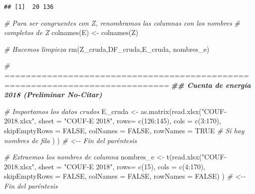 \documentclass[
]{article}
\newenvironment{Shaded}{\begin{snugshade}}{\end{snugshade}}
\newcommand{\AttributeTok}[1]{\textcolor[rgb]{0.77,0.63,0.00}{#1}}
\newcommand{\CommentTok}[1]{\textcolor[rgb]{0.56,0.35,0.01}{\textit{#1}}}
\newcommand{\ConstantTok}[1]{\textcolor[rgb]{0.00,0.00,0.00}{#1}}
\newcommand{\DecValTok}[1]{\textcolor[rgb]{0.00,0.00,0.81}{#1}}
\newcommand{\DocumentationTok}[1]{\textcolor[rgb]{0.56,0.35,0.01}{\textbf{\textit{#1}}}}
\newcommand{\FunctionTok}[1]{\textcolor[rgb]{0.00,0.00,0.00}{#1}}
\newcommand{\NormalTok}[1]{#1}
\newcommand{\OtherTok}[1]{\textcolor[rgb]{0.56,0.35,0.01}{#1}}
\newcommand{\SpecialCharTok}[1]{\textcolor[rgb]{0.00,0.00,0.00}{#1}}
\newcommand{\StringTok}[1]{\textcolor[rgb]{0.31,0.60,0.02}{#1}}
\begin{document}
\begin{verbatim}
## [1]  20 136
\end{verbatim}

\begin{Shaded}
\begin{Highlighting}[]
\CommentTok{\# Para ser congruentes con Z, renombramos las columnas con los nombres}
\CommentTok{\# completos de Z}
\FunctionTok{colnames}\NormalTok{(E) }\OtherTok{\textless{}{-}} \FunctionTok{colnames}\NormalTok{(Z)}

\CommentTok{\# Hacemos limpieza}
\FunctionTok{rm}\NormalTok{(Z\_cruda,DF\_cruda,E\_cruda, nombres\_e)}

\CommentTok{\# =============================================================================}
\DocumentationTok{\#\# Cuenta de energía 2018 (Preliminar No{-}Citar)}

\CommentTok{\# Importamos los datos crudos}
\NormalTok{E\_cruda }\OtherTok{\textless{}{-}} \FunctionTok{as.matrix}\NormalTok{(}\FunctionTok{read.xlsx}\NormalTok{(}\StringTok{"COUF{-}2018.xlsx"}\NormalTok{, }
                               \AttributeTok{sheet =} \StringTok{"COUF{-}E 2018"}\NormalTok{, }
                               \AttributeTok{rows=} \FunctionTok{c}\NormalTok{(}\DecValTok{126}\SpecialCharTok{:}\DecValTok{145}\NormalTok{), }
                               \AttributeTok{cols =} \FunctionTok{c}\NormalTok{(}\DecValTok{3}\SpecialCharTok{:}\DecValTok{170}\NormalTok{), }
                               \AttributeTok{skipEmptyRows =} \ConstantTok{FALSE}\NormalTok{, }
                               \AttributeTok{colNames =} \ConstantTok{FALSE}\NormalTok{, }
                               \AttributeTok{rowNames =} \ConstantTok{TRUE} \CommentTok{\# Sí hay nombres de fila}
\NormalTok{                               )}
\NormalTok{)  }\CommentTok{\# \textless{}{-}{-} Fin del paréntesis}

\CommentTok{\# Extraemos los nombres de columna}
\NormalTok{nombres\_e }\OtherTok{\textless{}{-}} \FunctionTok{t}\NormalTok{(}\FunctionTok{read.xlsx}\NormalTok{(}\StringTok{"COUF{-}2018.xlsx"}\NormalTok{, }
                         \AttributeTok{sheet =} \StringTok{"COUF{-}E 2018"}\NormalTok{, }
                         \AttributeTok{rows=} \FunctionTok{c}\NormalTok{(}\DecValTok{15}\NormalTok{), }
                         \AttributeTok{cols =} \FunctionTok{c}\NormalTok{(}\DecValTok{4}\SpecialCharTok{:}\DecValTok{170}\NormalTok{), }
                         \AttributeTok{skipEmptyRows =} \ConstantTok{FALSE}\NormalTok{, }
                         \AttributeTok{colNames =} \ConstantTok{FALSE}\NormalTok{, }
                         \AttributeTok{rowNames =} \ConstantTok{FALSE}\NormalTok{)}
\NormalTok{)  }\CommentTok{\# \textless{}{-}{-} Fin del paréntesis}


\end{Highlighting}
\end{Shaded}
\end{document}

